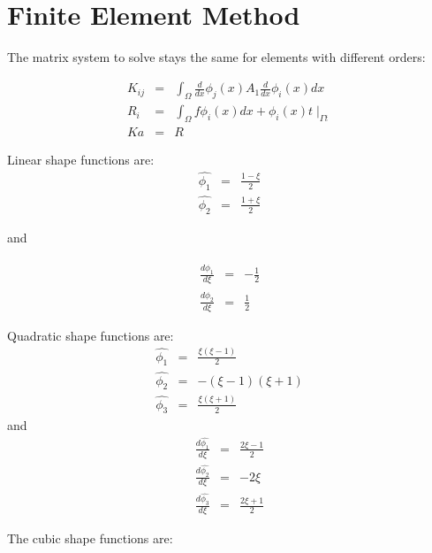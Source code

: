 \documentclass[paper=a4, fontsize=11pt]{article} %
\begin{document}

\section{Finite Element Method}

The matrix system to solve stays the same for elements with different orders:
 
\begin{eqnarray}
K_{ij} &=& \int_{\Omega} \frac{d}{dx} \phi_j(x) A_1 \frac{d}{dx} \phi_i(x) dx \nonumber\\
R_i &=& \int_{\Omega} f \phi_i(x) dx + \phi_i(x) t \mid _{\Gamma t}\nonumber\\
K a &=& R
\end{eqnarray}

Linear shape functions are:
\begin{eqnarray}
\hat{\phi_1} &=& \frac{1-\xi}{2}\nonumber\\
\hat{\phi_2} &=& \frac{1+\xi}{2}
\end{eqnarray}

and

\begin{eqnarray}
\frac{d\hat{\phi_1}}{d\xi} &=& -\frac{1}{2}\nonumber\\
\frac{d\hat{\phi_2}}{d\xi} &=& \frac{1}{2}
\end{eqnarray}

Quadratic shape functions are:
\begin{eqnarray}
\hat{\phi_1} &=& \frac{\xi(\xi-1)}{2} \nonumber\\
\hat{\phi_2} &=& -(\xi-1)(\xi+1)\nonumber\\
\hat{\phi_3} &=& \frac{\xi(\xi+1)} {2}
\end{eqnarray}
and 
\begin{eqnarray}
\frac{d\hat{\phi_1}}{d\xi} &=& \frac{2\xi-1}{2} \nonumber\\
\frac{d\hat{\phi_2}}{d\xi} &=& -2\xi \nonumber\\
\frac{d\hat{\phi_3}}{d\xi} &=& \frac{2\xi+1}{2}
\end{eqnarray}

The cubic shape functions are:
\end{document}
